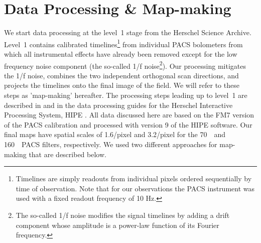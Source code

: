 \documentclass[manuscript]{aastex61}
\begin{document}
\section{Data Processing \& Map-making}
\label{sec:dp}
\par
We start data processing at the level~1 stage from the Herschel Science Archive.  Level~1 contains calibrated timelines\footnote{Timelines are simply readouts from individual pixels ordered sequentially by time of observation.  Note that for our observations the PACS instrument was used with a fixed readout frequency of 10 Hz.} from individual PACS bolometers from which all instrumental effects have already been removed except for the low frequency noise component (the so-called 1/f noise\footnote{The so-called 1/f noise modifies the signal timelines by adding a drift component whose amplitude is a power-law function of its Fourier frequency.}).  Our processing mitigates the 1/f noise, combines the two independent orthogonal scan directions, and projects the timelines onto the final image of the field.  We will refer to these steps as 'map-making' hereafter.  The processing steps leading up to level~1 are described in \citet{pacs} and in the data processing guides for the Herschel Interactive Processing System, HIPE \cite{hipe}.  All data discussed here are based on the FM7 version of the PACS calibration \citep{pacscal} and processed with version 9 of the HIPE software.  Our final maps have spatial scales of 1.6\arcsec/pixel and 3.2\arcsec/pixel for the 70~\micron\ and 160~\micron\ PACS filters, respectively.  We used two different approaches for map-making that are described below.
\end{document}
